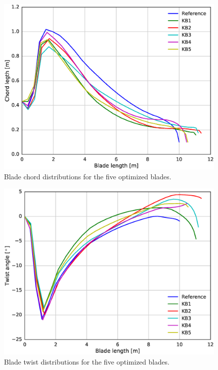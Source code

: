 \begin{figure}[pht]
\begin{center}
	\includegraphics[width=.85\linewidth]{figures/KBcomp_chord.eps}
\end{center}
\caption{Blade chord distributions for the five optimized blades.}
\label{fig:chord}
\end{figure}


\begin{figure}[pht]
\begin{center}
	\includegraphics[width=.85\linewidth]{figures/KBcomp_twist.eps}
\end{center}
\caption{Blade twist distributions for the five optimized blades.}
\label{fig:twist}
\end{figure}

